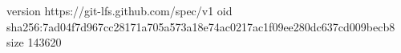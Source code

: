 version https://git-lfs.github.com/spec/v1
oid sha256:7ad04f7d967cc28171a705a573a18e74ac0217ac1f09ee280dc637cd009becb8
size 143620
